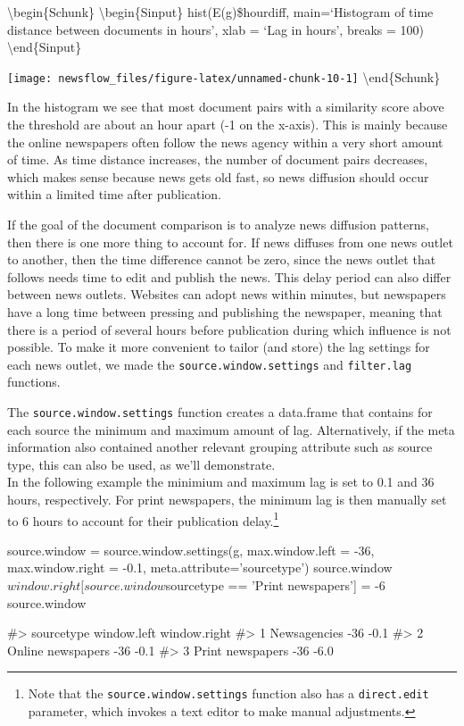 \textbackslash{}begin\{Schunk\} \textbackslash{}begin\{Sinput\}
hist(E(g)\$hourdiff, main=`Histogram of time distance between documents
in hours', xlab = `Lag in hours', breaks = 100)
\textbackslash{}end\{Sinput\}

\texttt{[image: newsflow\_files/figure-latex/unnamed-chunk-10-1]}
\textbackslash{}end\{Schunk\}

In the histogram we see that most document pairs with a similarity score
above the threshold are about an hour apart (-1 on the x-axis). This is
mainly because the online newspapers often follow the news agency within
a very short amount of time. As time distance increases, the number of
document pairs decreases, which makes sense because news gets old fast,
so news diffusion should occur within a limited time after publication.

If the goal of the document comparison is to analyze news diffusion
patterns, then there is one more thing to account for. If news diffuses
from one news outlet to another, then the time difference cannot be
zero, since the news outlet that follows needs time to edit and publish
the news. This delay period can also differ between news outlets.
Websites can adopt news within minutes, but newspapers have a long time
between pressing and publishing the newspaper, meaning that there is a
period of several hours before publication during which influence is not
possible. To make it more convenient to tailor (and store) the lag
settings for each news outlet, we made the
\texttt{source.window.settings} and \texttt{filter.lag} functions.

The \texttt{source.window.settings} function creates a data.frame that
contains for each source the minimum and maximum amount of lag.
Alternatively, if the meta information also contained another relevant
grouping attribute such as source type, this can also be used, as we'll
demonstrate.\\In the following example the minimium and maximum lag is
set to 0.1 and 36 hours, respectively. For print newspapers, the minimum
lag is then manually set to 6 hours to account for their publication
delay.\footnote{Note that the \texttt{source.window.settings} function
  also has a \texttt{direct.edit} parameter, which invokes a text editor
  to make manual adjustments.}

\begin{Schunk}
\begin{Sinput}
source.window = source.window.settings(g, max.window.left = -36, max.window.right = -0.1, 
                                       meta.attribute='sourcetype')
source.window$window.right[source.window$sourcetype == 'Print newspapers'] = -6
source.window
\end{Sinput}
\begin{Soutput}
#>          sourcetype window.left window.right
#> 1      Newsagencies         -36         -0.1
#> 2 Online newspapers         -36         -0.1
#> 3  Print newspapers         -36         -6.0
\end{Soutput}
\end{Schunk}

